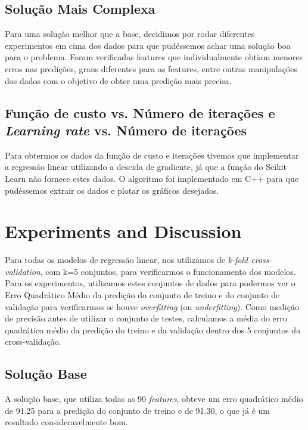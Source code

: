 \documentclass[conference]{IEEEtran}
\begin{document}
\subsection{Solução Mais Complexa}
Para uma solução melhor que a base, decidimos por rodar diferentes experimentos em cima dos dados para que pudéssemos achar uma solução boa para o problema. Foram verificadas features que individualmente obtiam menores erros nas predições, graus diferentes para as features, entre outras manipulações dos dados com o objetivo de obter uma predição mais precisa.

\subsection{Função de custo vs. Número de iterações e \textit{Learning rate} vs. Número de iterações}
Para obtermos os dados da função de custo e iterações tivemos que implementar a regressão linear utilizando a descida de gradiente, já que a função do Scikit Learn não fornece estes dados. O algoritmo foi implementado em C++ para que pudéssemos extrair os dados e plotar os gráficos desejados.

\section{Experiments and Discussion}
Para todas os modelos de regressão linear, nos utilizamos de \textit{k-fold cross-validation}, com k=5 conjuntos, para verificarmos o funcionamento dos modelos. Para os experimentos, utilizamos estes conjuntos de dados para podermos ver o Erro Quadrático Médio da predição do conjunto de treino e do conjunto de validação para verificarmos se houve \textit{overfitting} (ou \textit{underfitting}). Como medição de precisão antes de utilizar o conjunto de testes, calculamos a média do erro quadrático médio da predição do treino e da validação dentro dos 5 conjuntos da cross-validação.

\subsection{Solução Base}
A solução base, que utiliza todas as 90 \textit{features}, obteve um erro quadrático médio de 91.25 para a predição do conjunto de treino e de 91.30, o que já é um resultado consideravelmente bom.
\end{document}
